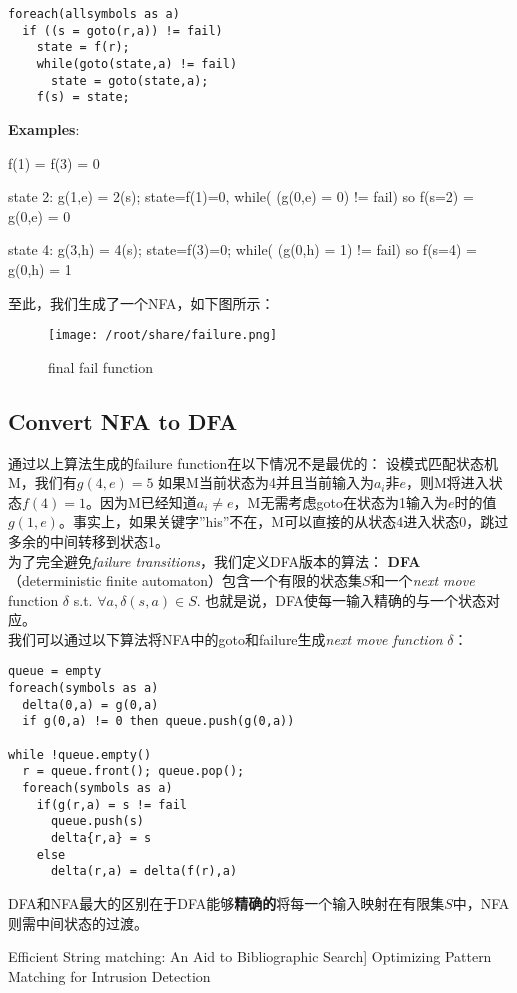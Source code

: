 \documentclass{article}
\begin{document}
\begin{lstlisting}
foreach(allsymbols as a)
  if ((s = goto(r,a)) != fail)
    state = f(r);
    while(goto(state,a) != fail)
      state = goto(state,a);
    f(s) = state;
\end{lstlisting}

\textbf{Examples}:
\begin{list}{}{}
  \item  f(1) = f(3) = 0
  \item  state 2: g(1,e) = 2(s); state=f(1)=0, while( (g(0,e) = 0) != fail) so f(s=2) = g(0,e) = 0
  \item  state 4: g(3,h) = 4(s); state=f(3)=0; while( (g(0,h) = 1) != fail) so f(s=4) = g(0,h) = 1
\end{list}
至此，我们生成了一个NFA，如下图所示：
\begin{figure}[h]
  \centering
  \caption{final fail function}
\texttt{[image: /root/share/failure.png]}
\end{figure}
\subsection{Convert NFA to DFA}

通过以上算法生成的failure function在以下情况不是最优的：
设模式匹配状态机M，我们有$g(4,e) = 5$
如果M当前状态为4并且当前输入为$a_i$非$e$，则M将进入状态$f(4)=1$。因为M已经知道$a_i \ne e$，M无需考虑goto在状态为1输入为$e$时的值$g(1,e)$。事实上，如果关键字”his”不在，M可以直接的从状态4进入状态0，跳过多余的中间转移到状态1。\\
为了完全避免\textit{failure transitions}，我们定义DFA版本的算法：
\textbf{DFA}（deterministic finite automaton）包含一个有限的状态集$S$和一个\textit{next move} function $\delta$ s.t. $\forall a, \delta(s,a) \in S$. 也就是说，DFA使每一输入精确的与一个状态对应。\\
我们可以通过以下算法将NFA中的goto和failure生成\textit{next move function} $\delta$：
\begin{lstlisting}
queue = empty
foreach(symbols as a)
  delta(0,a) = g(0,a)
  if g(0,a) != 0 then queue.push(g(0,a))

while !queue.empty()
  r = queue.front(); queue.pop();
  foreach(symbols as a)
    if(g(r,a) = s != fail
      queue.push(s)
      delta{r,a} = s
    else
      delta(r,a) = delta(f(r),a)
\end{lstlisting}

DFA和NFA最大的区别在于DFA能够\textbf{精确的}将每一个输入映射在有限集$S$中，NFA则需中间状态的过渡。

\begin{thebibliography}{99}
 Efficient String matching: An Aid to Bibliographic Search]
 Optimizing Pattern Matching for Intrusion Detection
\end{thebibliography}
\end{document}
